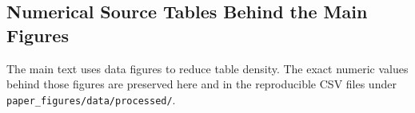 

\subsection{Numerical Source Tables Behind the Main Figures}

The main text uses data figures to reduce table density. The exact numeric values behind those figures are preserved here and in the reproducible CSV files under \texttt{paper\_figures/data/processed/}.










